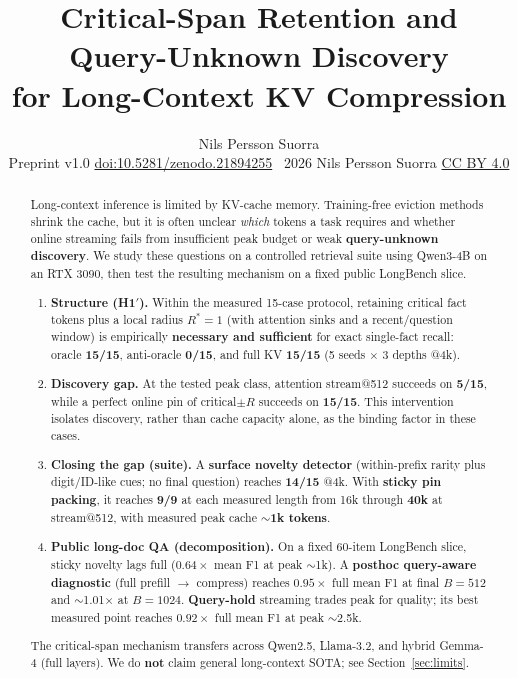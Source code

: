 \documentclass[11pt,a4paper]{article}
\title{\textbf{Critical-Span Retention and Query-Unknown Discovery\\for Long-Context KV Compression}}
\author{Nils Persson Suorra\\[3pt]
\footnotesize Preprint v1.0 \quad
\href{https://doi.org/10.5281/zenodo.21894255}{doi:10.5281/zenodo.21894255} \quad
\textcopyright~2026 Nils Persson Suorra \quad
\href{https://creativecommons.org/licenses/by/4.0/}{CC BY 4.0}}
\date{}
\begin{document}
\maketitle
\begin{abstract}
Long-context inference is limited by KV-cache memory. Training-free eviction methods shrink the cache, but it is often unclear \emph{which} tokens a task requires and whether online streaming fails from insufficient peak budget or weak \textbf{query-unknown discovery}. We study these questions on a controlled retrieval suite using Qwen3-4B on an RTX 3090, then test the resulting mechanism on a fixed public LongBench slice.

\begin{enumerate}[leftmargin=*,itemsep=2pt]
  \item \textbf{Structure (H1$'$).}
  Within the measured 15-case protocol, retaining critical fact tokens plus a local radius $R^*=1$ (with attention sinks and a recent/question window) is empirically \textbf{necessary and sufficient} for exact single-fact recall: oracle \textbf{15/15}, anti-oracle \textbf{0/15}, and full KV \textbf{15/15} (5 seeds $\times$ 3 depths @4k).
  \item \textbf{Discovery gap.}
  At the tested peak class, attention stream@512 succeeds on \textbf{5/15}, while a perfect online pin of critical$\pm R$ succeeds on \textbf{15/15}. This intervention isolates discovery, rather than cache capacity alone, as the binding factor in these cases.
  \item \textbf{Closing the gap (suite).}
  A \textbf{surface novelty detector} (within-prefix rarity plus digit/ID-like cues; no final question) reaches \textbf{14/15} @4k. With \textbf{sticky pin packing}, it reaches \textbf{9/9} at each measured length from 16k through \textbf{40k} at stream@512, with measured peak cache $\sim$\textbf{1k tokens}.
  \item \textbf{Public long-doc QA (decomposition).}
  On a fixed 60-item LongBench slice, sticky novelty lags full ($0.64\times$ mean F1 at peak $\sim$1k). A \textbf{posthoc query-aware diagnostic} (full prefill $\to$ compress) reaches $0.95\times$ full mean F1 at final $B=512$ and $\sim$1.01$\times$ at $B=1024$. \textbf{Query-hold} streaming trades peak for quality; its best measured point reaches $0.92\times$ full mean F1 at peak $\sim$2.5k.
\end{enumerate}

The critical-span mechanism transfers across Qwen2.5, Llama-3.2, and hybrid Gemma-4 (full layers). We do \textbf{not} claim general long-context SOTA; see Section~\ref{sec:limits}.
\end{abstract}
\end{document}
